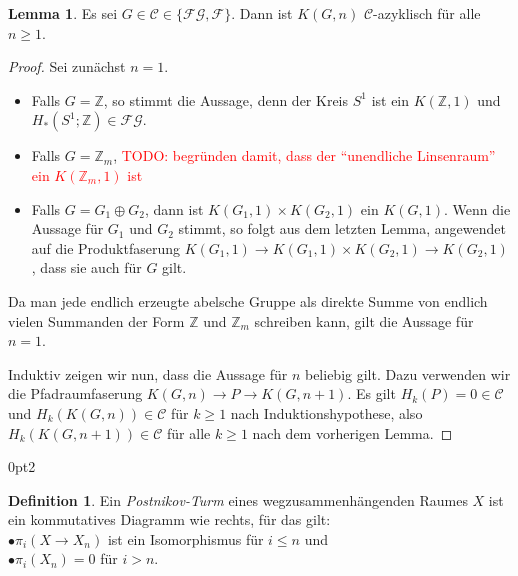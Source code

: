 \documentclass[11pt, a4paper, german]{article}
\theoremstyle{definition}
\newtheorem{lem}{Lemma}
\newtheorem{defn}{Definition}
\theoremstyle{remark}
\newcommand{\TODO}[1]{\textcolor{red}{TODO: #1}} %
\newcommand{\Z}{\mathbb{Z}} %
\newcommand{\SC}{\mathcal{C}} %
\newcommand{\FG}{\mathcal{FG}} %
\newcommand{\F}{\mathcal{F}} %
\newenvironment{centertikzcd}
  {\begin{center}\begin{tikzcd}}
  {\end{tikzcd}\end{center}}
\begin{document}
\begin{lem}\label{homology-kgn-in-c}
  Es sei $G \in \SC \in \{ \FG, \F \}$.
  Dann ist $K(G, n)$ $\SC$-azyklisch für alle $n \geq 1$.
\end{lem}

\begin{proof}
  Sei zunächst $n=1$.
  \begin{itemize}
    \item Falls $G = \Z$, so stimmt die Aussage, denn der Kreis $S^1$ ist ein $K(\Z, 1)$ und $H_*(S^1; \Z) \in \FG$.
    \item Falls $G = \Z_m$, \TODO{begründen damit, dass der "`unendliche Linsenraum"' ein $K(\Z_m, 1)$ ist}
    \item Falls $G = G_1 \oplus G_2$, dann ist $K(G_1, 1) \times K(G_2, 1)$ ein $K(G, 1)$.
    Wenn die Aussage für $G_1$ und $G_2$ stimmt, so folgt aus dem letzten Lemma, angewendet auf die Produktfaserung $K(G_1, 1) \to K(G_1, 1) \times K(G_2, 1) \to K(G_2, 1)$, dass sie auch für $G$ gilt.
  \end{itemize}
  Da man jede endlich erzeugte abelsche Gruppe als direkte Summe von endlich vielen Summanden der Form $\Z$ und $\Z_m$ schreiben kann, gilt die Aussage für $n=1$.

  Induktiv zeigen wir nun, dass die Aussage für $n$ beliebig gilt.
  Dazu verwenden wir die Pfadraumfaserung $K(G, n) \to P \to K(G, n{+}1)$.
  Es gilt $H_k(P) = 0 \in \SC$ und $H_k(K(G, n)) \in \SC$ für $k \geq 1$ nach Induktionshypothese, also $H_k(K(G, n{+}1)) \in \SC$ für alle $k \geq 1$ nach dem vorherigen Lemma.
\end{proof}


\renewcommand\windowpagestuff{
  \vspace{1cm}
  \begin{centertikzcd}[ampersand replacement=\&, column sep=0.2cm, row sep=0.5cm]
    \&\&\& X \arrow[dll] \arrow[dl] \arrow[d] \\
    \dots \arrow[r] \&
    X_3 \arrow[r] \&
    X_2 \arrow[r] \&
    X_1
  \end{centertikzcd}
}
\opencutright
\begin{cutout}{0}{\dimexpr\linewidth-4.5cm\relax}{0pt}{2}
  \begin{defn}
    Ein \emph{Postnikov-Turm} eines wegzusammenhängenden Raumes $X$ ist ein kommutatives Diagramm wie rechts, für das gilt: \\[3pt]
    \quad$\bullet$\enspace $\pi_i(X \to X_n)$ ist ein Isomorphismus für $i \leq n$ und \\
    \quad$\bullet$\enspace $\pi_i(X_n) = 0$ für $i > n$.
  \end{defn}
\end{cutout}
\end{document}
